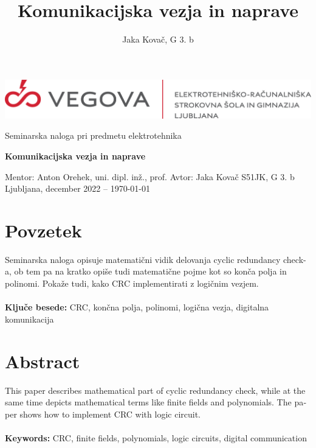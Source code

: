 \documentclass[12pt]{article}
\title{Komunikacijska vezja in naprave}
\author{Jaka Kovač, G 3. b}
\begin{document}

\begin{center}
    \thispagestyle{empty}
    \includegraphics[scale=1]{slike/logotip_vegova_leze_brezokvirja.png}
    
    \vspace{\fill} 
    Seminarska naloga pri predmetu elektrotehnika

    \Huge{\textbf{Komunikacijska vezja in naprave}}

    \normalsize
    \vspace{\fill}

    Mentor: Anton Orehek, uni. dipl. inž., prof. \hfill Avtor: Jaka Kovač S51JK,
    G 3. b\\
    \null
    Ljubljana, december 2022 – \MMYYYYdate\today
\end{center}
\newpage
\thispagestyle{empty}
\null
\newpage
\thispagestyle{empty}

\section*{Povzetek}
Seminarska naloga opisuje matematični vidik delovanja cyclic redundancy check-a,
ob tem pa na kratko opiše tudi matematične pojme kot so konča polja in polinomi.
Pokaže tudi, kako CRC implementirati z logičnim vezjem.\\
\\
\textbf{Ključe besede:} CRC, končna polja, polinomi, logična vezja, digitalna
komunikacija\\

\vfill
\section*{Abstract}
\foreignlanguage{english}{This paper describes mathematical part of cyclic 
redundancy check, while at the same time depicts mathematical terms like finite
fields and polynomials. The paper shows how to implement CRC with logic circuit.
\\
\\
\textbf{Keywords:} CRC, finite fields, polynomials, logic circuits, digital 
communication}

\vfill
\newpage
\thispagestyle{empty}
\tableofcontents
\end{document}
